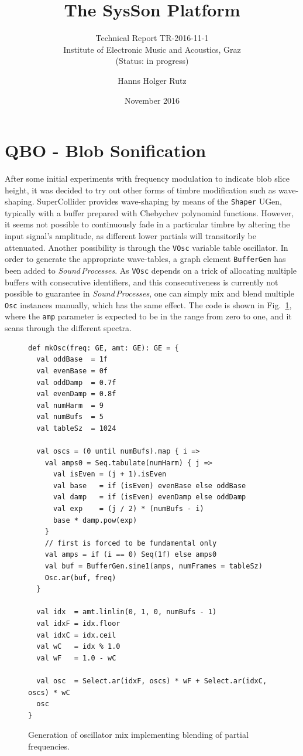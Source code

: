 \documentclass[11pt,a4paper]{article}
\title{The SysSon Platform}
\subtitle{Technical Report TR-2016-11-1\\Institute of Electronic Music and Acoustics, Graz\\(Status: in progress)}
\author{Hanns Holger Rutz}
\date{November 2016}
\newcommand{\figref}[1]{Fig.~\ref{#1}}
\newcommand{\software}[1]{\textit{#1}}
\begin{document}
\maketitle
{}
\thispagestyle{empty}
\newpage
\section{QBO - Blob Sonification}

After some initial experiments with frequency modulation to indicate blob slice height, it was decided to try out other forms of timbre modification such as wave-shaping. SuperCollider provides wave-shaping by means of the \Verb!Shaper! UGen, typically with a buffer prepared with Chebychev polynomial functions. However, it seems not possible to continuously fade in a particular timbre by altering the input signal's amplitude, as different lower partials will transitorily be attenuated. Another possibility is through the \Verb!VOsc! variable table oscillator. In order to generate the appropriate wave-tables, a graph element \Verb!BufferGen! has been added to \software{Sound\,Processes}. As \Verb!VOsc! depends on a trick of allocating multiple buffers with consecutive identifiers, and this consecutiveness is currently not possible to guarantee in \software{Sound\,Processes}, one can simply mix and blend multiple \Verb!Osc! instances manually, which has the same effect. The code is shown in \figref{fig:wave-shaping-mk-osc}, where the \Verb!amp! parameter is expected to be in the range from zero to one, and it scans through the different spectra.

\begin{figure}[b]
\begin{lstlisting}[style=scala]
def mkOsc(freq: GE, amt: GE): GE = {
  val oddBase  = 1f
  val evenBase = 0f
  val oddDamp  = 0.7f
  val evenDamp = 0.8f
  val numHarm  = 9
  val numBufs  = 5
  val tableSz  = 1024
  
  val oscs = (0 until numBufs).map { i =>
    val amps0 = Seq.tabulate(numHarm) { j =>
      val isEven = (j + 1).isEven
      val base   = if (isEven) evenBase else oddBase
      val damp   = if (isEven) evenDamp else oddDamp
      val exp    = (j / 2) * (numBufs - i)
      base * damp.pow(exp)
    }
    // first is forced to be fundamental only
    val amps = if (i == 0) Seq(1f) else amps0
    val buf = BufferGen.sine1(amps, numFrames = tableSz)
    Osc.ar(buf, freq)
  }
  
  val idx  = amt.linlin(0, 1, 0, numBufs - 1)
  val idxF = idx.floor
  val idxC = idx.ceil
  val wC   = idx % 1.0
  val wF   = 1.0 - wC
  
  val osc  = Select.ar(idxF, oscs) * wF + Select.ar(idxC, oscs) * wC
  osc
}
\end{lstlisting}
\caption{Generation of oscillator mix implementing blending of partial frequencies.}
\label{fig:wave-shaping-mk-osc}
\end{figure}
\end{document}
